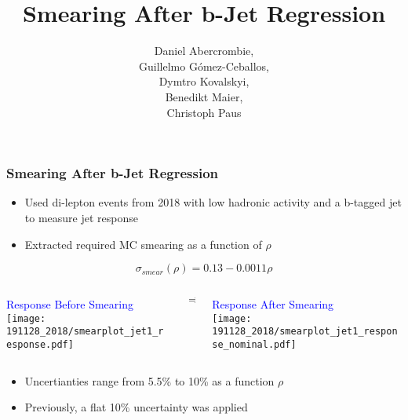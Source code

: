 \documentclass{beamer}
\author{
  Daniel Abercrombie, \\
  Guillelmo G\'omez-Ceballos, \\
  Dymtro Kovalskyi, \\
  Benedikt Maier, \\
  Christoph Paus
}
\title{\bf \sffamily Smearing After b-Jet Regression}
\begin{document}
\begin{frame}
  \titlepage
\end{frame}

\begin{frame}
  \frametitle{Smearing After b-Jet Regression}

  \begin{itemize}
  \item Used di-lepton events from 2018 with low hadronic activity and
    a b-tagged jet to measure jet response
  \item Extracted required MC smearing as a function of $\rho$
  \end{itemize}

  \centering

  \vspace{-24pt}
  \[
  \sigma_{smear}(\rho) = 0.13 - 0.0011\rho
  \]

  \begin{columns}
    \begin{column}{0.42\linewidth}
      \centering
      \textcolor{blue}{Response Before Smearing} \\
      \texttt{[image: 191128\_2018/smearplot\_jet1\_response.pdf]}
    \end{column}
    \begin{column}{0.05\linewidth}
      \centering
      \Huge
      $\Rightarrow$
    \end{column}
    \begin{column}{0.42\linewidth}
      \centering
      \textcolor{blue}{Response After Smearing} \\
      \texttt{[image: 191128\_2018/smearplot\_jet1\_response\_nominal.pdf]}
    \end{column}
  \end{columns}

  \begin{itemize}
  \item Uncertianties range from 5.5\% to 10\% as a function $\rho$
  \item Previously, a flat 10\% uncertainty was applied
  \end{itemize}

\end{frame}
\end{document}
